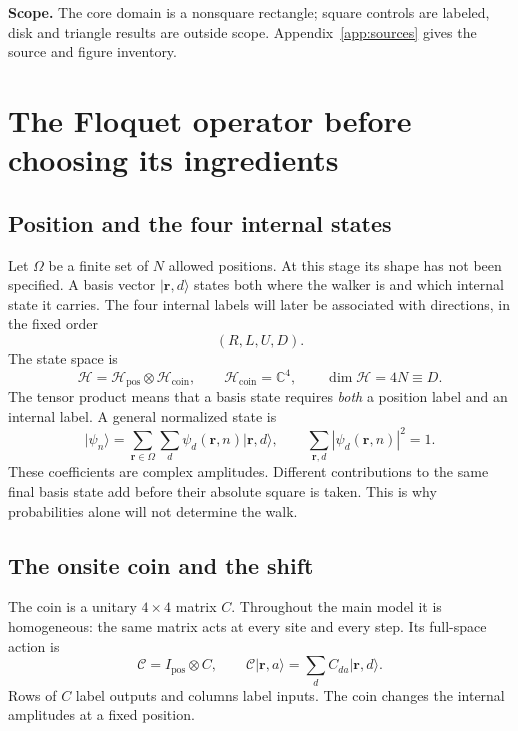 \documentclass[11pt,a4paper,oneside]{report}
\newcommand{\ket}[1]{\lvert #1\rangle}
\newcommand{\HH}{\mathcal H}
\newcommand{\CC}{\mathcal C}
\newcommand{\Id}{I}
\numberwithin{equation}{chapter}
\begin{document}
\textbf{Scope.} The core domain is a nonsquare rectangle; square controls
are labeled, disk and triangle results are outside scope.
Appendix~\ref{app:sources} gives the source and figure inventory.

\begingroup
\setlength{\parskip}{0pt}
\small
\tableofcontents
\endgroup

\clearpage
{}


\chapter{The Floquet operator before choosing its ingredients}
\label{ch:general}

\section{Position and the four internal states}

Let \(\Omega\) be a finite set of \(N\) allowed positions. At this
stage its shape has not been specified. A basis vector
\(\ket{\mathbf r,d}\) states both where the walker is and which
internal state it carries. The four internal labels will later be
associated with directions, in the fixed order
\[
(R,L,U,D).
\]
The state space is
\begin{equation}
\HH=\HH_{\mathrm{pos}}\otimes\HH_{\mathrm{coin}},\qquad
\HH_{\mathrm{coin}}=\mathbb C^4,\qquad
\dim\HH=4N\equiv D.
\end{equation}
The tensor product means that a basis state requires \emph{both}
a position label and an internal label. A general normalized state is
\begin{equation}
\ket{\psi_n}=\sum_{\mathbf r\in\Omega}\sum_d
\psi_d(\mathbf r,n)\ket{\mathbf r,d},\qquad
\sum_{\mathbf r,d}|\psi_d(\mathbf r,n)|^2=1.
\end{equation}
These coefficients are complex amplitudes. Different contributions to
the same final basis state add before their absolute square is taken.
This is why probabilities alone will not determine the walk.

\section{The onsite coin and the shift}

The coin is a unitary \(4\times4\) matrix \(C\). Throughout the main
model it is homogeneous: the same matrix acts at every site and every
step. Its full-space action is
\begin{equation}
\CC=\Id_{\mathrm{pos}}\otimes C,\qquad
\CC\ket{\mathbf r,a}=\sum_d C_{da}\ket{\mathbf r,d}.
\end{equation}
Rows of \(C\) label outputs and columns label inputs. The coin changes
the internal amplitudes at a fixed position.
\end{document}
